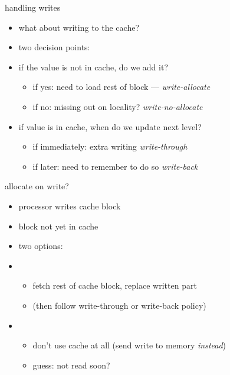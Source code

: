 \usetikzlibrary{arrows.meta,matrix,positioning,shapes.callouts,shapes.misc,fit,calc}

\begin{frame}{handling writes}
    \begin{itemize}
    \item what about writing to the cache?
    \item two decision points:
    \vspace{.5cm}
    \item if the value is not in cache, do we add it?
        \begin{itemize}
        \item if yes: need to load rest of block --- \textit{write-allocate}
        \item if no: missing out on locality? \textit{write-no-allocate}
        \end{itemize}   
    \item if value is in cache, when do we update next level?
        \begin{itemize}
        \item if immediately: extra writing \textit{write-through}
        \item if later: need to remember to do so \textit{write-back}
        \end{itemize}
    \end{itemize}
\end{frame}

\begin{frame}{allocate on write?}
\begin{itemize}
\item processor writes  cache block
\item block not yet in cache
\item two options:
\vspace{0.5cm}
\item {}
    \begin{itemize}
    \item fetch rest of cache block, replace written part
    \item (then follow write-through or write-back policy)
    \end{itemize}
\item {}
    \begin{itemize}
    \item don't use cache at all (send write to memory \textit{instead})
    \item guess: not read soon?
    \end{itemize}
\end{itemize}
\end{frame}

